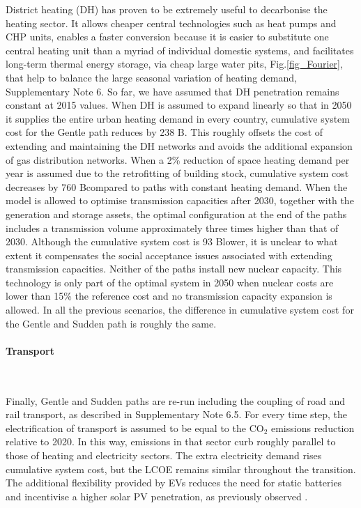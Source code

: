 \documentclass[5p]{elsarticle} %
\begin{document}
District heating (DH) has proven to be extremely useful to decarbonise the heating sector. It allows cheaper central technologies such as heat pumps and CHP units, enables a faster conversion because it is easier to substitute one central heating unit than a myriad of individual domestic systems, and facilitates long-term thermal energy storage, via cheap large water pits, Fig.\ref{fig_Fourier}, that help to balance the large seasonal variation of heating demand, Supplementary Note 6. So far, we have assumed that DH penetration remains constant at 2015 values. When DH is assumed to expand linearly so that in 2050 it supplies the entire urban heating demand in every country, cumulative system cost for the Gentle path reduces by 238 B\EUR. This roughly offsets the cost of extending and maintaining the DH networks and avoids the additional expansion of gas distribution networks. When a 2\% reduction of space heating demand per year is assumed due to the retrofitting of building stock, cumulative system cost decreases by 760 B\EUR compared to paths with constant heating demand. When the model is allowed to optimise transmission capacities after 2030, together with the generation and storage assets, the optimal configuration at the end of the paths includes a transmission volume approximately three times higher than that of 2030. Although the cumulative system cost is 93 B\EUR lower, it is unclear to what extent it compensates the social acceptance issues associated with extending transmission capacities. Neither of the paths install new nuclear capacity. This technology is only part of the optimal system in 2050 when nuclear costs are lower than 15\% the reference cost and no transmission capacity expansion is allowed. In all the previous scenarios, the difference in cumulative system cost for the Gentle and Sudden path is roughly the same.

\paragraph{\textbf{Transport}} \

Finally, Gentle and Sudden paths are re-run including the coupling of road and rail transport, as described in Supplementary Note 6.5. For every time step, the electrification of transport is assumed to be equal to the CO$_2$ emissions reduction relative to 2020. In this way, emissions in that sector curb roughly parallel to those of heating and electricity sectors. The extra electricity demand rises cumulative system cost, but the LCOE remains similar throughout the transition. The additional flexibility provided by EVs reduces the need for static batteries and incentivise a higher solar PV penetration, as previously observed \cite{Brown_2018, Victoria_2019_storage}.
\end{document}
